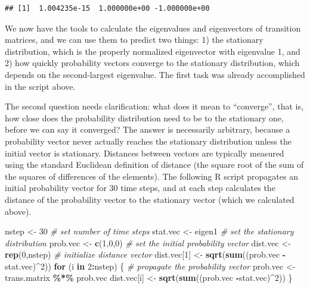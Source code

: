 \documentclass[
]{book}
\newenvironment{Shaded}{\begin{snugshade}}{\end{snugshade}}
\newcommand{\CommentTok}[1]{\textcolor[rgb]{0.56,0.35,0.01}{\textit{#1}}}
\newcommand{\ControlFlowTok}[1]{\textcolor[rgb]{0.13,0.29,0.53}{\textbf{#1}}}
\newcommand{\DecValTok}[1]{\textcolor[rgb]{0.00,0.00,0.81}{#1}}
\newcommand{\KeywordTok}[1]{\textcolor[rgb]{0.13,0.29,0.53}{\textbf{#1}}}
\newcommand{\NormalTok}[1]{#1}
\newcommand{\OperatorTok}[1]{\textcolor[rgb]{0.81,0.36,0.00}{\textbf{#1}}}
\newcommand{\StringTok}[1]{\textcolor[rgb]{0.31,0.60,0.02}{#1}}
\theoremstyle{definition}
\theoremstyle{definition}
\theoremstyle{definition}
\theoremstyle{remark}
\begin{document}
\begin{verbatim}
## [1]  1.004235e-15  1.000000e+00 -1.000000e+00
\end{verbatim}

We now have the tools to calculate the eigenvalues and eigenvectors of transition matrices, and we can use them to predict two things: 1) the stationary distribution, which is the properly normalized eigenvector with eigenvalue 1, and 2) how quickly probability vectors converge to the stationary distribution, which depends on the second-largest eigenvalue. The first task was already accomplished in the script above.

The second question needs clarification: what does it mean to ``converge'', that is, how close does the probability distribution need to be to the stationary one, before we can say it converged? The answer is necessarily arbitrary, because a probability vector never actually reaches the stationary distribution unless the initial vector is stationary. Distances between vectors are typically measured using the standard Euclidean definition of distance (the square root of the sum of the squares of differences of the elements). The following R script propagates an initial probability vector for 30 time steps, and at each step calculates the distance of the probability vector to the stationary vector (which we calculated above).

\begin{Shaded}
\begin{Highlighting}[]
\NormalTok{nstep \textless{}{-}}\StringTok{ }\DecValTok{30} \CommentTok{\# set number of time steps}
\NormalTok{stat.vec \textless{}{-}}\StringTok{ }\NormalTok{eigen1 }\CommentTok{\# set the stationary distribution}
\NormalTok{prob.vec \textless{}{-}}\StringTok{ }\KeywordTok{c}\NormalTok{(}\DecValTok{1}\NormalTok{,}\DecValTok{0}\NormalTok{,}\DecValTok{0}\NormalTok{) }
\CommentTok{\# set the initial probability vector}
\NormalTok{dist.vec \textless{}{-}}\StringTok{ }\KeywordTok{rep}\NormalTok{(}\DecValTok{0}\NormalTok{,nstep) }\CommentTok{\# initialize distance vector}
\NormalTok{dist.vec[}\DecValTok{1}\NormalTok{] \textless{}{-}}\StringTok{ }\KeywordTok{sqrt}\NormalTok{(}\KeywordTok{sum}\NormalTok{((prob.vec }\OperatorTok{{-}}\NormalTok{stat.vec)}\OperatorTok{\^{}}\DecValTok{2}\NormalTok{))}
\ControlFlowTok{for}\NormalTok{ (i }\ControlFlowTok{in} \DecValTok{2}\OperatorTok{:}\NormalTok{nstep) \{ }
  \CommentTok{\# propagate the probability vector}
\NormalTok{  prob.vec \textless{}{-}}\StringTok{ }\NormalTok{trans.matrix }\OperatorTok{\%*\%}\StringTok{ }\NormalTok{prob.vec}
\NormalTok{  dist.vec[i] \textless{}{-}}\StringTok{ }\KeywordTok{sqrt}\NormalTok{(}\KeywordTok{sum}\NormalTok{((prob.vec }\OperatorTok{{-}}\NormalTok{stat.vec)}\OperatorTok{\^{}}\DecValTok{2}\NormalTok{))}
\NormalTok{\}}
\end{Highlighting}
\end{Shaded}
\end{document}

